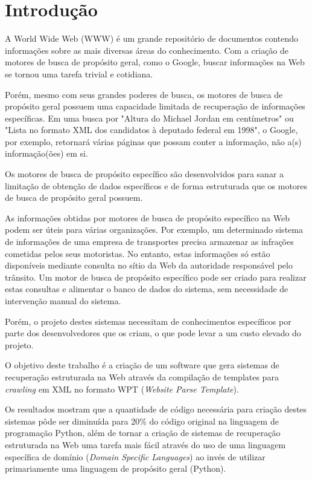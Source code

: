 \chapter{Introdução}

A World Wide Web (WWW) é um grande repositório de documentos contendo informações sobre as mais diversas áreas do conhecimento. Com a criação de motores de busca de propósito geral, como o Google, buscar informações na Web se tornou uma tarefa trivial e cotidiana.

Porém, mesmo com seus grandes poderes de busca, os motores de busca de propósito geral possuem uma capacidade limitada de recuperação de informações específicas. Em uma busca por "Altura do Michael Jordan em centímetros" ou "Lista no formato XML dos candidatos à deputado federal em 1998", o Google, por exemplo, retornará várias páginas que possam conter a informação, não a(s) informação(ões) em si.

Os motores de busca de propósito específico são desenvolvidos para sanar a limitação de obtenção de dados específicos e de forma estruturada que os motores de busca de propósito geral possuem.

As informações obtidas por motores de busca de propósito específico na Web podem ser úteis para várias organizações. Por exemplo, um determinado sistema de informações de uma empresa de transportes precisa armazenar as infrações cometidas pelos seus motoristas. No entanto, estas informações só estão disponíveis mediante consulta no sítio da Web da autoridade responsável pelo trânsito. Um motor de busca de propósito específico pode ser criado para realizar estas consultas e alimentar o banco de dados do sistema, sem necessidade de intervenção manual do sistema.

Porém, o projeto destes sistemas necessitam de conhecimentos específicos por parte dos desenvolvedores que os criam, o que pode levar a um custo elevado do projeto.

O objetivo deste trabalho é a criação de um software que gera sistemas de recuperação estruturada na Web através da compilação de templates para \emph{crawling} em XML no formato WPT (\emph{Website Parse Template}).

Os resultados mostram que a quantidade de código necessária para criação destes sistemas pôde ser diminuída para 20\% do código original na linguagem de programação Python, além de tornar a criação de sistemas de recuperação estruturada na Web uma tarefa mais fácil através do uso de uma linguagem específica de domínio (\emph{Domain Specific Languages}) ao invés de utilizar primariamente uma linguagem de propósito geral (Python).